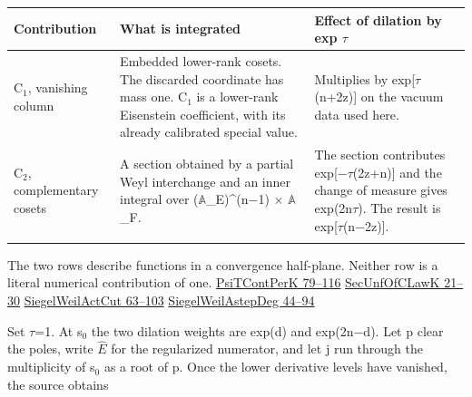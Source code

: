 \documentclass[11pt,letterpaper]{article}
\begin{document}
{\small
\begin{longtable}{@{}>{\raggedright\arraybackslash}p{0.24\dimexpr\linewidth-4\tabcolsep\relax}>{\raggedright\arraybackslash}p{0.38\dimexpr\linewidth-4\tabcolsep\relax}>{\raggedright\arraybackslash}p{0.38\dimexpr\linewidth-4\tabcolsep\relax}@{}}
\toprule
\textbf{Contribution} & \textbf{What is integrated} & \textbf{Effect of dilation by exp \ensuremath{\tau}}\\\midrule\endhead
C\ensuremath{{}_{1}}, vanishing column & Embedded lower-rank cosets. The discarded coordinate has mass one. C\ensuremath{{}_{1}} is a lower-rank Eisenstein coefficient, with its already calibrated special value. & Multiplies by exp[\ensuremath{\tau}(n+2z)] on the vacuum data used here.\\\addlinespace[4pt]
C\ensuremath{{}_{2}}, complementary cosets & A section obtained by a partial Weyl interchange and an inner integral over (\ensuremath{\mathbb{A}}\_E)\textasciicircum{}(n\ensuremath{-}1) \ensuremath{\times} \ensuremath{\mathbb{A}}\_F. & The section contributes exp[\ensuremath{-}\ensuremath{\tau}(2z+n)] and the change of measure gives exp(2n\ensuremath{\tau}). The result is exp[\ensuremath{\tau}(n\ensuremath{-}2z)].\\\addlinespace[4pt]
\bottomrule\end{longtable}}
The two rows describe functions in a convergence half-plane. Neither row is a literal numerical contribution of one. \href{https://github.com/nousentllc/riemann-hypothesis/blob/40e56bab026552e089d7afcfeff08d2defb9c005/src/Development/AutomorphicArithmetic/Foundations/GaloisRepresentations/ThetaParseval/ThetaKernels/PsiTContPerK.lean\#L79-L116}{PsiTContPerK 79–116} \href{https://github.com/nousentllc/riemann-hypothesis/blob/40e56bab026552e089d7afcfeff08d2defb9c005/src/Development/AutomorphicArithmetic/Foundations/GaloisRepresentations/ThetaParseval/ThetaKernels/SecUnfOfCLawK.lean\#L21-L30}{SecUnfOfCLawK 21–30} \href{https://github.com/nousentllc/riemann-hypothesis/blob/40e56bab026552e089d7afcfeff08d2defb9c005/src/Development/AutomorphicArithmetic/Foundations/GaloisRepresentations/ThetaParseval/ThetaKernels/SiegelWeilActCut.lean\#L63-L103}{SiegelWeilActCut 63–103} \href{https://github.com/nousentllc/riemann-hypothesis/blob/40e56bab026552e089d7afcfeff08d2defb9c005/src/Development/AutomorphicArithmetic/Foundations/GaloisRepresentations/ThetaParseval/ThetaKernels/SiegelWeilAstepDeg.lean\#L44-L94}{SiegelWeilAstepDeg 44–94}

Set \ensuremath{\tau}=1. At s\ensuremath{{}_{0}} the two dilation weights are exp(d) and exp(2n\ensuremath{-}d). Let p clear the poles, write \ensuremath{\widehat E} for the regularized numerator, and let j run through the multiplicity of s\ensuremath{{}_{0}} as a root of p. Once the lower derivative levels have vanished, the source obtains
\end{document}
